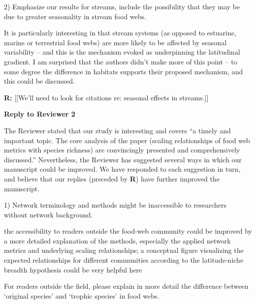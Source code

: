 \documentclass[12pt]{letter}
\newenvironment{refquote}{\bigskip \begin{it}}{\end{it}\smallskip}
\begin{document}
   2) Emphasize our results for streams, include the possibility that they
   may be due to greater seasonality in stream food webs. 

  \begin{refquote}

    It is particularly interesting in that stream systems (as opposed to
    estuarine, marine or terrestrial food webs) are more likely to be affected
    by seasonal variability – and this is the mechanism evoked as underpinning
    the latitudinal gradient. I am surprised that the authors didn’t make more
    of this point – to some degree the difference in habitats supports their
    proposed mechanism, and this could be discussed.

  \end{refquote}


  \textbf{R:} [[We'll need to look for citations re: seasonal effects in streams.]]


  \begin{quotation}


  \end{quotation}


  \newpage

{\Large \bf Reply to Reviewer 2}

  The Reviewer stated that our study is interesting and covers ``a timely and
  important topic. The core analysis of the paper (scaling relationships of
  food web metrics with species richness) are convincingly presented and
  comprehensively discussed.'' Nevertheless, the Reviewer has suggested several
  ways in which our manuscript could be improved. We have responded to each suggestion
  in turn, and believe that our replies (preceded by \textbf{R}) have further improved
  the manuscript.



  1) Network terminology and methods might be inaccessible to researchers
  without network background.

  \begin{refquote}

    the accessibility to readers outside the food-web community could be
    improved by a more detailed explanation of the methods, especially the
    applied network metrics and underlying scaling relationships; a conceptual
    figure visualizing the expected relationships for different communities
    according to the latitude-niche breadth hypothesis could be very helpful
    here

    \smallskip

     For readers outside the field, please explain in more detail the
     difference between `original species' and `trophic species' in food webs.

  \end{refquote}
\end{document}
